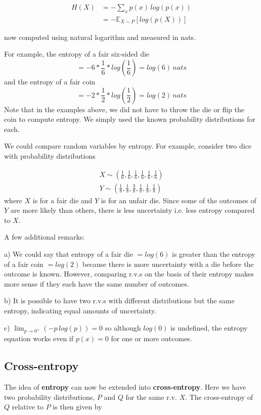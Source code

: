 \documentclass[fleqn, 12pt]{article}
\begin{document}
\begin{align}
    H(X) & = -\sum_x{p(x)\,log(p(x))}\\[10pt]
    & = - \mathbb{E}_{X\sim P}[log(p(X))]
\end{align}

now computed using natural logarithm and measured in nats.

For example, the entropy of a fair six-sided die
\begin{equation}
    = -6 * \frac{1}{6} * log(\frac{1}{6}) = log(6) \,nats
\end{equation}
and the entropy of a fair coin
\begin{equation}
    = -2 * \frac{1}{2} * log(\frac{1}{2}) = log(2) \,nats
\end{equation}
Note that in the examples above, we did not have to throw the die or flip the coin to compute entropy. We simply used the known probability distributions for each.

We could compare random variables by entropy. For example, consider two dice with probability distributions

\begin{align}
    X \sim (\frac{1}{6}, \frac{1}{6}, \frac{1}{6}, \frac{1}{6}, \frac{1}{6}, \frac{1}{6}) \\[20pt]
    Y \sim (\frac{1}{8}, \frac{1}{8}, \frac{3}{8}, \frac{1}{8}, \frac{1}{8}, \frac{1}{8})
\end{align}
where $X$ is for a fair die and $Y$ is for an unfair die. Since some of the outcomes of $Y$ are more likely than others, there is less uncertainty i.e. less entropy compared to $X$.

A few additional remarks:

a) We could say that entropy of a fair die $ = log (6)$ is greater than the entropy of a fair coin $ = log(2)$ because there is more uncertainty with a die before the outcome is known. However, comparing r.v.s on the basis of their entropy makes more sense if they each have the same number of outcomes.

b) It is possible to have two r.v.s with different distributions but the same entropy, indicating equal amounts of uncertainty.

c) $\lim_{p\rightarrow 0^+} (-p \, log(p)) = 0 $ so although $log(0)$ is undefined, the entropy equation works even if $p(x) = 0$ for one or more outcomes.

\subsection{Cross-entropy}
The idea of \textbf{entropy} can now be extended into \textbf{cross-entropy}. Here we have two probability distributions, $P$ and $Q$ for the same r.v. $X$. The cross-entropy of $Q$ relative to $P$ is then given by
\end{document}
